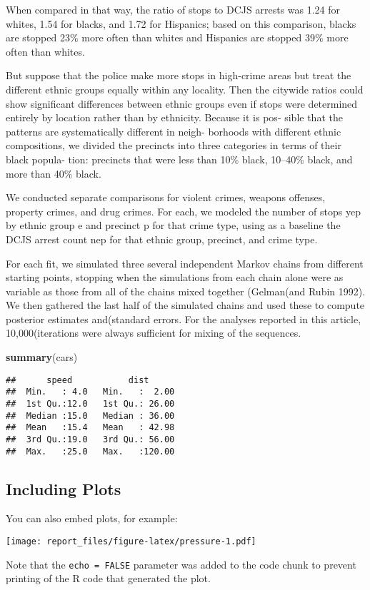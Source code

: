 \documentclass[]{article}
\newenvironment{Shaded}{\begin{snugshade}}{\end{snugshade}}
\newcommand{\KeywordTok}[1]{\textcolor[rgb]{0.13,0.29,0.53}{\textbf{#1}}}
\newcommand{\NormalTok}[1]{#1}
\begin{document}
When compared in that way, the ratio of stops to DCJS arrests was 1.24
for whites, 1.54 for blacks, and 1.72 for Hispanics; based on this
comparison, blacks are stopped 23\% more often than whites and Hispanics
are stopped 39\% more often than whites.

But suppose that the police make more stops in high-crime areas but
treat the different ethnic groups equally within any locality. Then the
citywide ratios could show significant differences between ethnic groups
even if stops were determined entirely by location rather than by
ethnicity. Because it is pos- sible that the patterns are systematically
different in neigh- borhoods with different ethnic compositions, we
divided the precincts into three categories in terms of their black
popula- tion: precincts that were less than 10\% black, 10--40\% black,
and more than 40\% black.

We conducted separate comparisons for violent crimes, weapons offenses,
property crimes, and drug crimes. For each, we modeled the number of
stops yep by ethnic group e and precinct p for that crime type, using as
a baseline the DCJS arrest count nep for that ethnic group, precinct,
and crime type.

For each fit, we simulated three several independent Markov chains from
different starting points, stopping when the simulations from each chain
alone were as variable as those from all of the chains mixed together
(Gelman(and Rubin 1992). We then gathered the last half of the simulated
chains and used these to compute posterior estimates and(standard
errors. For the analyses reported in this article, 10,000(iterations
were always sufficient for mixing of the sequences.

\begin{Shaded}
\begin{Highlighting}[]
\KeywordTok{summary}\NormalTok{(cars)}
\end{Highlighting}
\end{Shaded}

\begin{verbatim}
##      speed           dist       
##  Min.   : 4.0   Min.   :  2.00  
##  1st Qu.:12.0   1st Qu.: 26.00  
##  Median :15.0   Median : 36.00  
##  Mean   :15.4   Mean   : 42.98  
##  3rd Qu.:19.0   3rd Qu.: 56.00  
##  Max.   :25.0   Max.   :120.00
\end{verbatim}

\hypertarget{including-plots}{%
\subsection{Including Plots}\label{including-plots}}

You can also embed plots, for example:

\texttt{[image: report\_files/figure-latex/pressure-1.pdf]}

Note that the \texttt{echo\ =\ FALSE} parameter was added to the code
chunk to prevent printing of the R code that generated the plot.
\end{document}
